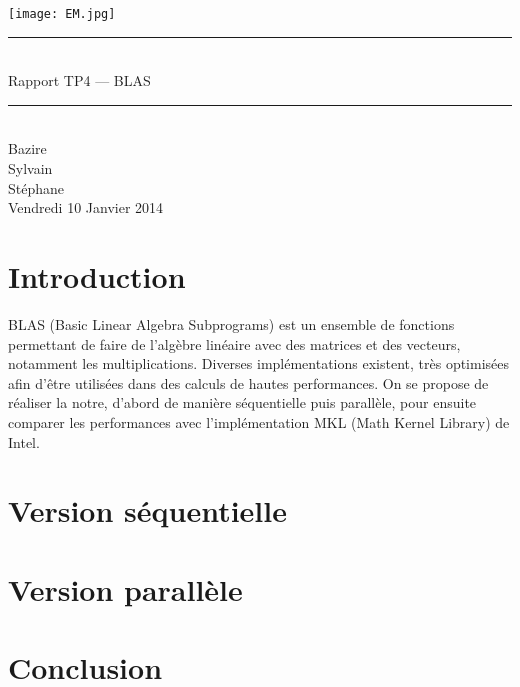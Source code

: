 \documentclass[a4paper,11pt]{article}
\begin{document}
\begin{titlepage}
  \begin{center}

    \begin{center}
      \texttt{[image: EM.jpg]}
    \end{center}

    \vspace*{1cm}
        
    \rule{0.75\linewidth}{0.7mm}\\[0.4cm]
    {\Huge Rapport TP4 --- BLAS\\[0.4cm]}
    \rule{0.75\linewidth}{0.7mm} \\[1.5cm]

    {\Large Bazire \\Sylvain {}\\Stéphane \\[2cm]}
    {\Large Vendredi 10 Janvier 2014}
  \end{center}
\end{titlepage}

\tableofcontents
\clearpage
\section{Introduction}

BLAS (Basic Linear Algebra Subprograms) est un ensemble de fonctions permettant de faire de l'algèbre linéaire avec des matrices et des vecteurs, notamment les multiplications. Diverses implémentations existent, très optimisées afin d'être utilisées dans des calculs de hautes performances. On se propose de réaliser la notre, d'abord de manière séquentielle puis parallèle, pour ensuite comparer les performances avec l'implémentation MKL (Math Kernel Library) de Intel.

\section{Version séquentielle}

\section{Version parallèle}

\section{Conclusion}
\end{document}
